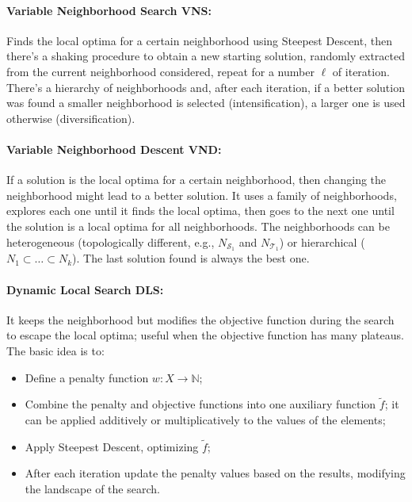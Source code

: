 \documentclass{article}
\begin{document}
	\paragraph{Variable Neighborhood Search VNS:} Finds the local optima for a certain neighborhood using Steepest Descent, then there's a shaking procedure to obtain a new starting solution, randomly extracted from the current neighborhood considered, repeat for a number $\ell$ of iteration. There's a hierarchy of neighborhoods and, after each iteration, if a better solution was found a smaller neighborhood is selected (intensification), a larger one is used otherwise (diversification).\\
	
	\paragraph{Variable Neighborhood Descent VND:} If a solution is the local optima for a certain neighborhood, then changing the neighborhood might lead to a better solution. It uses a family of neighborhoods, explores each one until it finds the local optima, then goes to the next one until the solution is a local optima for all neighborhoods. The neighborhoods can be heterogeneous (topologically different, e.g., $N_{\mathcal{S}_1}$ and $N_{\mathcal{T}_1}$) or hierarchical ($N_1 \subset \dots \subset N_k$). The last solution found is always the best one.\\
	
	\paragraph{Dynamic Local Search DLS:} It keeps the neighborhood but modifies the objective function during the search to escape the local optima; useful when the objective function has many plateaus. The basic idea is to: 
	\begin{itemize}
		\item Define a penalty function $w: X \rightarrow \mathbb{N}$;
		\item Combine the penalty and objective functions into one auxiliary function $\tilde f$; it can be applied additively or multiplicatively to the values of the elements;
		\item Apply Steepest Descent, optimizing $\tilde f$;
		\item After each iteration update the penalty values based on the results, modifying the landscape of the search.\\
	\end{itemize}
	
\end{document}
